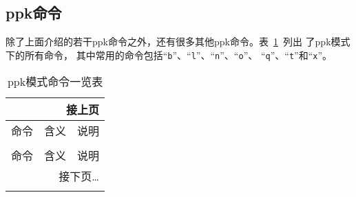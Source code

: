 \subsection{ppk命令}
除了上面介绍的若干ppk命令之外，还有很多其他ppk命令。表~\ref{table:plotpk-commands}~列出
了ppk模式下的所有命令，
其中常用的命令包括``\verb+b+''、``\verb+l+''、``\verb+n+''、``\verb+o+''、
``\verb+q+''、``\verb+t+''和``\verb+x+''。

\begin{center}
\small\ttfamily
\begin{longtable}{cll}
\multicolumn{3}{r}{接上页} \\
\toprule
命令    &   含义    &   说明    \\
\midrule
\endhead
\caption{ppk模式命令一览表} \label{table:plotpk-commands}   \\
\toprule
命令    &   含义    &   说明    \\
\midrule
\endfirsthead
\bottomrule
\multicolumn{3}{r}{接下页\dots} \\
\endfoot
\bottomrule
\endlastfoot


\end{longtable}
\end{center}
